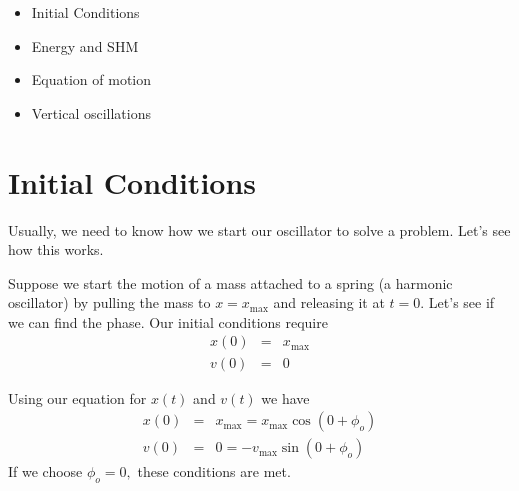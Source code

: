 \documentclass{book}
\begin{document}
\vspace{0.10in}%

\begin{itemize}
\item Initial Conditions

\item Energy and SHM

\item Equation of motion

\item Vertical oscillations
\end{itemize}

\section{Initial Conditions}

Usually, we need to know how we start our oscillator to solve a problem.
Let's see how this works.

Suppose we start the motion of a mass attached to a spring (a harmonic
oscillator) by pulling the mass to $x=x_{\max }$ and releasing it at $t=0.$
Let's see if we can find the phase. Our initial conditions require 
\begin{eqnarray*}
x\left( 0\right) &=&x_{\max } \\
v\left( 0\right) &=&0
\end{eqnarray*}

Using our equation for $x\left( t\right) $ and $v\left( t\right) $ we have%
\begin{eqnarray*}
x\left( 0\right) &=&x_{\max }=x_{\max }\cos \left( 0+\phi _{o}\right) \\
v\left( 0\right) &=&0=-v_{\max }\sin \left( 0+\phi _{o}\right)
\end{eqnarray*}%
If we choose $\phi _{o}=0,$ these conditions are met.
\end{document}
